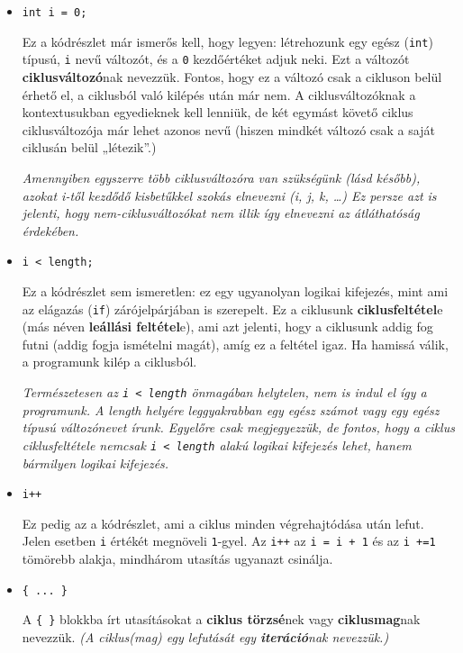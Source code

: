 \documentclass[a4paper]{article}
\begin{document}
\begin{itemize}
	\item \lstinline{int i = 0;}
	
	Ez a kódrészlet már ismerős kell, hogy legyen: létrehozunk egy egész (\lstinline{int}) típusú, \lstinline{i} nevű változót, és a \lstinline{0} kezdőértéket adjuk neki. Ezt a változót \textbf{ciklusváltozó}nak nevezzük. Fontos, hogy ez a változó csak a cikluson belül érhető el, a ciklusból való kilépés után már nem. A ciklusváltozóknak a kontextusukban egyedieknek kell lenniük, de két egymást követő ciklus ciklusváltozója már lehet azonos nevű (hiszen mindkét változó csak a saját ciklusán belül „létezik”.)
	
	\emph{Amennyiben egyszerre több ciklusváltozóra van szükségünk (lásd később), azokat i-től kezdődő kisbetűkkel szokás elnevezni (i, j, k, …) Ez persze azt is jelenti, hogy nem-ciklusváltozókat nem illik így elnevezni az átláthatóság érdekében.}
	
	\item \lstinline{i < length;}
	
	Ez a kódrészlet sem ismeretlen: ez egy ugyanolyan logikai kifejezés, mint ami az elágazás (\lstinline{if}) zárójelpárjában is szerepelt. Ez a ciklusunk \textbf{ciklusfeltétel}e (más néven \textbf{leállási feltétel}e), ami azt jelenti, hogy a ciklusunk addig fog futni (addig fogja ismételni magát), amíg ez a feltétel igaz. Ha hamissá válik, a programunk kilép a ciklusból.
	
	\emph{Természetesen az \lstinline{i < length} önmagában helytelen, nem is indul el így a programunk. A length helyére leggyakrabban egy egész számot vagy egy egész típusú változónevet írunk. Egyelőre csak megjegyezzük, de fontos, hogy a ciklus ciklusfeltétele nemcsak \lstinline{i < length} alakú logikai kifejezés lehet, hanem bármilyen logikai kifejezés.}
	
	\item \lstinline{i++}
	
	Ez pedig az a kódrészlet, ami a ciklus minden végrehajtódása után lefut. Jelen esetben \lstinline{i} értékét megnöveli \lstinline{1}-gyel. Az \lstinline{i++} az \lstinline{i = i + 1} és az \lstinline{i +=1} tömörebb alakja, mindhárom utasítás ugyanazt csinálja.
	
	\item \lstinline!{ ... }!
	
	A \lstinline!{ }! blokkba írt utasításokat a \textbf{ciklus törzsé}nek vagy \textbf{ciklusmag}nak nevezzük. \emph{(A ciklus(mag) egy lefutását egy \textbf{iteráció}nak nevezzük.)}
	
\end{itemize}
\end{document}

